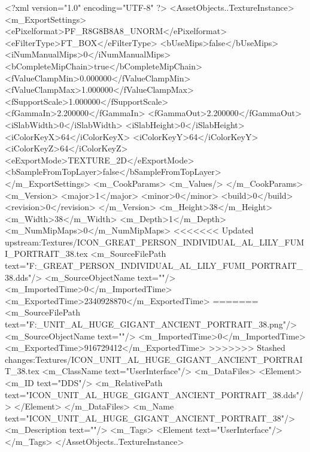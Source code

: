 <?xml version="1.0" encoding="UTF-8" ?>
<AssetObjects..TextureInstance>
	<m_ExportSettings>
		<ePixelformat>PF_R8G8B8A8_UNORM</ePixelformat>
		<eFilterType>FT_BOX</eFilterType>
		<bUseMips>false</bUseMips>
		<iNumManualMips>0</iNumManualMips>
		<bCompleteMipChain>true</bCompleteMipChain>
		<fValueClampMin>0.000000</fValueClampMin>
		<fValueClampMax>1.000000</fValueClampMax>
		<fSupportScale>1.000000</fSupportScale>
		<fGammaIn>2.200000</fGammaIn>
		<fGammaOut>2.200000</fGammaOut>
		<iSlabWidth>0</iSlabWidth>
		<iSlabHeight>0</iSlabHeight>
		<iColorKeyX>64</iColorKeyX>
		<iColorKeyY>64</iColorKeyY>
		<iColorKeyZ>64</iColorKeyZ>
		<eExportMode>TEXTURE_2D</eExportMode>
		<bSampleFromTopLayer>false</bSampleFromTopLayer>
	</m_ExportSettings>
	<m_CookParams>
		<m_Values/>
	</m_CookParams>
	<m_Version>
		<major>1</major>
		<minor>0</minor>
		<build>0</build>
		<revision>0</revision>
	</m_Version>
	<m_Height>38</m_Height>
	<m_Width>38</m_Width>
	<m_Depth>1</m_Depth>
	<m_NumMipMaps>0</m_NumMipMaps>
<<<<<<< Updated upstream:Textures/ICON_GREAT_PERSON_INDIVIDUAL_AL_LILY_FUMI_PORTRAIT_38.tex
	<m_SourceFilePath text="F:\DT\lilyimages\gpportrait\ICON_GREAT_PERSON_INDIVIDUAL_AL_LILY_FUMI_PORTRAIT_38.dds"/>
	<m_SourceObjectName text=""/>
	<m_ImportedTime>0</m_ImportedTime>
	<m_ExportedTime>2340928870</m_ExportedTime>
=======
	<m_SourceFilePath text="F:\DT\lilyimages\all\ICON_UNIT_AL_HUGE_GIGANT_ANCIENT_PORTRAIT_38.png"/>
	<m_SourceObjectName text=""/>
	<m_ImportedTime>0</m_ImportedTime>
	<m_ExportedTime>916729412</m_ExportedTime>
>>>>>>> Stashed changes:Textures/ICON_UNIT_AL_HUGE_GIGANT_ANCIENT_PORTRAIT_38.tex
	<m_ClassName text="UserInterface"/>
	<m_DataFiles>
		<Element>
			<m_ID text="DDS"/>
			<m_RelativePath text="ICON_UNIT_AL_HUGE_GIGANT_ANCIENT_PORTRAIT_38.dds"/>
		</Element>
	</m_DataFiles>
	<m_Name text="ICON_UNIT_AL_HUGE_GIGANT_ANCIENT_PORTRAIT_38"/>
	<m_Description text=""/>
	<m_Tags>
		<Element text="UserInterface"/>
	</m_Tags>
</AssetObjects..TextureInstance>

